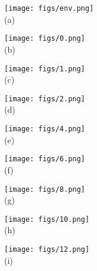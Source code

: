 \begin{figure}[htbp]
    \begin{minipage}[tb]{0.33\linewidth}
        \centering
        \texttt{[image: figs/env.png]}\\(a)
        \label{fig:env}
    \end{minipage}
    \begin{minipage}[tb]{0.33\linewidth}
        \centering
        \texttt{[image: figs/0.png]}\\(b)
        \label{fig:exploration_0}
    \end{minipage}
    \begin{minipage}[tb]{0.33\linewidth}
        \centering
        \texttt{[image: figs/1.png]}\\(c)
        \label{fig:exploration_1}
    \end{minipage}
    \begin{minipage}[tb]{0.33\linewidth}
        \centering
        \texttt{[image: figs/2.png]}\\(d)
        \label{fig:exploration_2}
    \end{minipage}
    \begin{minipage}[tb]{0.33\linewidth}
        \centering
        \texttt{[image: figs/4.png]}\\(e)
        \label{fig:exploration_3}
    \end{minipage}
    \begin{minipage}[tb]{0.33\linewidth}
        \centering
        \texttt{[image: figs/6.png]}\\(f)
        \label{fig:exploration_4}
    \end{minipage}
    \begin{minipage}[tb]{0.33\linewidth}
        \centering
        \texttt{[image: figs/8.png]}\\(g)
        \label{fig:exploration_5}
    \end{minipage}
    \begin{minipage}[tb]{0.33\linewidth}
        \centering
        \texttt{[image: figs/10.png]}\\(h)
        \label{fig:exploration_6}
    \end{minipage}
    \begin{minipage}[tb]{0.33\linewidth}
        \centering
        \texttt{[image: figs/12.png]}\\(i)

\end{minipage}
\end{figure}

